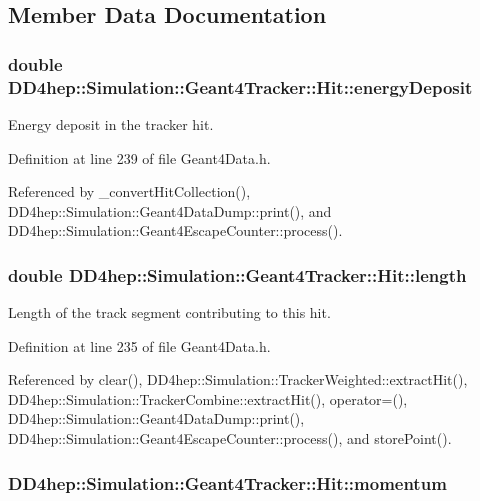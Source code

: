 \subsection{Member Data Documentation}
\hypertarget{class_d_d4hep_1_1_simulation_1_1_geant4_tracker_1_1_hit_a6dddc87da956928e52374040b025f7e4}{
\subsubsection[{energyDeposit}]{\setlength{\rightskip}{0pt plus 5cm}double {\bf DD4hep::Simulation::Geant4Tracker::Hit::energyDeposit}}}
\label{class_d_d4hep_1_1_simulation_1_1_geant4_tracker_1_1_hit_a6dddc87da956928e52374040b025f7e4}


Energy deposit in the tracker hit. 

Definition at line 239 of file Geant4Data.h.

Referenced by \_\-convertHitCollection(), DD4hep::Simulation::Geant4DataDump::print(), and DD4hep::Simulation::Geant4EscapeCounter::process().\hypertarget{class_d_d4hep_1_1_simulation_1_1_geant4_tracker_1_1_hit_a39d50debf1a95beaad59be2477877327}{
\subsubsection[{length}]{\setlength{\rightskip}{0pt plus 5cm}double {\bf DD4hep::Simulation::Geant4Tracker::Hit::length}}}
\label{class_d_d4hep_1_1_simulation_1_1_geant4_tracker_1_1_hit_a39d50debf1a95beaad59be2477877327}


Length of the track segment contributing to this hit. 

Definition at line 235 of file Geant4Data.h.

Referenced by clear(), DD4hep::Simulation::TrackerWeighted::extractHit(), DD4hep::Simulation::TrackerCombine::extractHit(), operator=(), DD4hep::Simulation::Geant4DataDump::print(), DD4hep::Simulation::Geant4EscapeCounter::process(), and storePoint().\hypertarget{class_d_d4hep_1_1_simulation_1_1_geant4_tracker_1_1_hit_abdd1f621f202ef83c2078a52cbb242b3}{
\subsubsection[{momentum}]{ {\bf DD4hep::Simulation::Geant4Tracker::Hit::momentum}}}
\label{class_d_d4hep_1_1_simulation_1_1_geant4_tracker_1_1_hit_abdd1f621f202ef83c2078a52cbb242b3}


